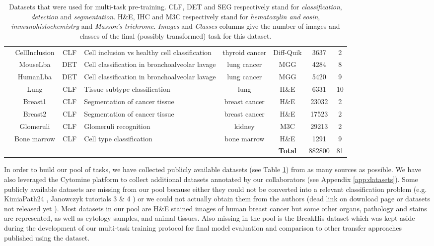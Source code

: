\begin{table}[t]
\begin{tabular}{|r|c|c|l|c|c|c|c|}
\cite{mormont2018comparison} & CellInclusion & CLF & Cell inclusion vs healthy cell classification & thyroid cancer & Diff-Quik & 3637 & 2 \\
\cite{mormont2018comparison} & MouseLba & DET & Cell classification in bronchoalveolar lavage & lung cancer & MGG & 4284 & 8 \\
\cite{mormont2018comparison} & HumanLba & DET & Cell classification in bronchoalveolar lavage & lung cancer & MGG & 5420 & 9 \\
\cite{mormont2018comparison} & Lung & CLF & Tissue subtype classification & lung & H\&E & 6331 & 10 \\
\cite{mormont2018comparison} & Breast1 & CLF & Segmentation of cancer tissue & breast cancer & H\&E & 23032 & 2 \\
\cite{mormont2018comparison} & Breast2 & CLF & Segmentation of cancer tissue & breast cancer & H\&E & 17523 & 2 \\
\cite{maree2016approach} & Glomeruli & CLF & Glomeruli recognition & kidney & M3C & 29213 & 2 \\
\cite{kainz2017training} & Bone marrow & CLF & Cell type classification & bone marrow & H\&E & 1291 & 9 \\
        \hline 
\multicolumn{5}{|c|}{} & \textbf{Total} & 882800 & 81 \\
\hline
    \end{tabular}
    \caption{Datasets that were used for multi-task pre-training. CLF, DET and SEG respectively stand for \textit{classification}, \textit{detection} and \textit{segmentation}. H\&E, IHC and M3C respectively stand for \textit{hematoxylin and eosin}, \textit{immunohistochemistry} and \textit{Masson's trichrome}. \textit{Images} and \textit{Classes} columns give the number of images and classes of the final (possibly transformed) task for this dataset.} 
    \label{tab:mtask:datasets}
\end{table}

In order to build our pool of tasks, we have collected publicly available datasets (see Table \ref{tab:mtask:datasets}) from as many sources as possible. We have also leveraged the Cytomine \cite{maree2016collaborative} platform to collect additional datasets annotated by our collaborators (see Appendix \ref{app:datasets}). Some publicly available datasets are missing from our pool because either they could not be converted into a relevant classification problem (e.g. KimiaPath24  \cite{babaie2017classification}, Janowczyk tutorials 3 \& 4 \cite{janowczyk2016deep}) or we could not actually obtain them from the authors (\eg dead link on download page or datasets not released yet \cite{gamper2019pannuke}). Most datasets in our pool are H\&E stained images of human breast cancer but some other organs, pathology and stains are represented, as well as cytology samples, and animal tissues. Also missing in the pool is the BreakHis dataset which was kept aside during the development of our multi-task training protocol for final model evaluation and comparison to other transfer approaches published using the dataset. 

